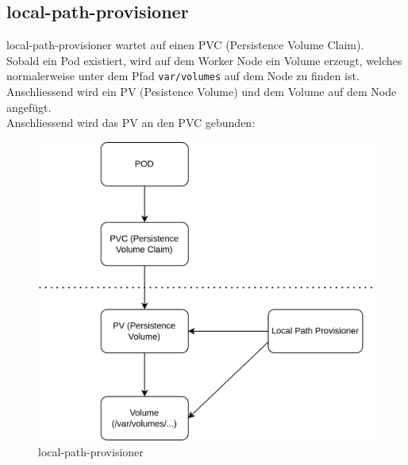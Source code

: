 
\begin{flushleft}
    \subsection{\gls{local-path-provisioner}}
    \gls{local-path-provisioner} wartet auf einen PVC (Persistence Volume Claim).\\
    Sobald ein Pod existiert, wird auf dem Worker Node ein Volume erzeugt, welches normalerweise unter dem Pfad \texttt{var/volumes} auf dem Node zu finden ist.\\
    Anschliessend wird ein PV (Pesistence Volume) und dem Volume auf dem Node angefügt.\\
    Anschliessend wird das PV an den PVC gebunden:
    \begin{figure}[H]
        \centering
        \includegraphics[width=0.5\linewidth]{source/appendix/local-path-provisioner/local-path-provisioner}
        \caption{\gls{local-path-provisioner}\cite{ZTILPG8B}}
        \label{fig:local-path-provisioner}
    \end{figure}
\end{flushleft}
